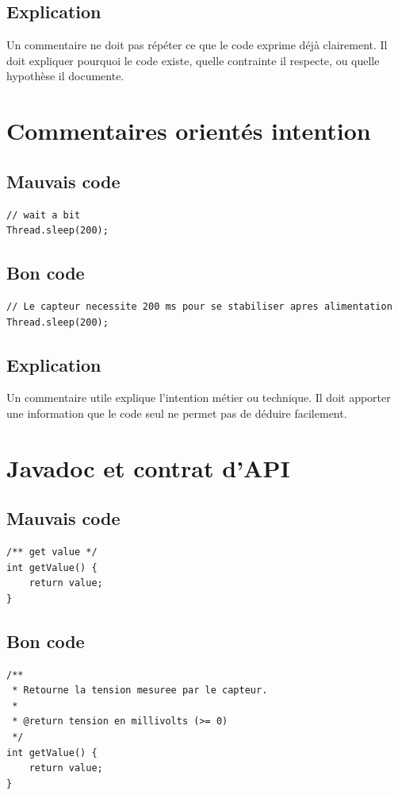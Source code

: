\documentclass[a4paper,11pt]{report}
\begin{document}
\section{Explication}
Un commentaire ne doit pas répéter ce que le code exprime déjà clairement.
Il doit expliquer pourquoi le code existe, quelle contrainte il respecte, ou quelle hypothèse il documente.

\chapter{Commentaires orientés intention}

\section{Mauvais code}
\begin{lstlisting}
// wait a bit
Thread.sleep(200);
\end{lstlisting}

\section{Bon code}
\begin{lstlisting}
// Le capteur necessite 200 ms pour se stabiliser apres alimentation
Thread.sleep(200);
\end{lstlisting}

\section{Explication}
Un commentaire utile explique l'intention métier ou technique.
Il doit apporter une information que le code seul ne permet pas de déduire facilement.

\chapter{Javadoc et contrat d'API}

\section{Mauvais code}
\begin{lstlisting}
/** get value */
int getValue() {
    return value;
}
\end{lstlisting}

\section{Bon code}
\begin{lstlisting}
/**
 * Retourne la tension mesuree par le capteur.
 *
 * @return tension en millivolts (>= 0)
 */
int getValue() {
    return value;
}
\end{lstlisting}
\end{document}
